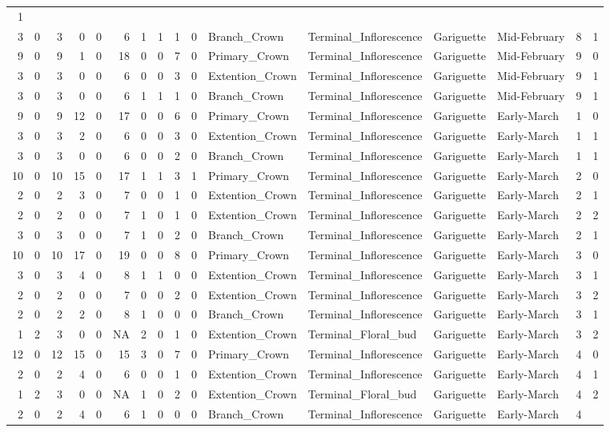 \documentclass[]{article}
\begin{document}
\begin{longtable}[]{@{}rrrrrrrrrrllllrl@{}}
1\tabularnewline
3 & 0 & 3 & 0 & 0 & 6 & 1 & 1 & 1 & 0 & Branch\_Crown &
Terminal\_Inflorescence & Gariguette & Mid-February & 8 &
1\tabularnewline
9 & 0 & 9 & 1 & 0 & 18 & 0 & 0 & 7 & 0 & Primary\_Crown &
Terminal\_Inflorescence & Gariguette & Mid-February & 9 &
0\tabularnewline
3 & 0 & 3 & 0 & 0 & 6 & 0 & 0 & 3 & 0 & Extention\_Crown &
Terminal\_Inflorescence & Gariguette & Mid-February & 9 &
1\tabularnewline
3 & 0 & 3 & 0 & 0 & 6 & 1 & 1 & 1 & 0 & Branch\_Crown &
Terminal\_Inflorescence & Gariguette & Mid-February & 9 &
1\tabularnewline
9 & 0 & 9 & 12 & 0 & 17 & 0 & 0 & 6 & 0 & Primary\_Crown &
Terminal\_Inflorescence & Gariguette & Early-March & 1 &
0\tabularnewline
3 & 0 & 3 & 2 & 0 & 6 & 0 & 0 & 3 & 0 & Extention\_Crown &
Terminal\_Inflorescence & Gariguette & Early-March & 1 &
1\tabularnewline
3 & 0 & 3 & 0 & 0 & 6 & 0 & 0 & 2 & 0 & Branch\_Crown &
Terminal\_Inflorescence & Gariguette & Early-March & 1 &
1\tabularnewline
10 & 0 & 10 & 15 & 0 & 17 & 1 & 1 & 3 & 1 & Primary\_Crown &
Terminal\_Inflorescence & Gariguette & Early-March & 2 &
0\tabularnewline
2 & 0 & 2 & 3 & 0 & 7 & 0 & 0 & 1 & 0 & Extention\_Crown &
Terminal\_Inflorescence & Gariguette & Early-March & 2 &
1\tabularnewline
2 & 0 & 2 & 0 & 0 & 7 & 1 & 0 & 1 & 0 & Extention\_Crown &
Terminal\_Inflorescence & Gariguette & Early-March & 2 &
2\tabularnewline
3 & 0 & 3 & 0 & 0 & 7 & 1 & 0 & 2 & 0 & Branch\_Crown &
Terminal\_Inflorescence & Gariguette & Early-March & 2 &
1\tabularnewline
10 & 0 & 10 & 17 & 0 & 19 & 0 & 0 & 8 & 0 & Primary\_Crown &
Terminal\_Inflorescence & Gariguette & Early-March & 3 &
0\tabularnewline
3 & 0 & 3 & 4 & 0 & 8 & 1 & 1 & 0 & 0 & Extention\_Crown &
Terminal\_Inflorescence & Gariguette & Early-March & 3 &
1\tabularnewline
2 & 0 & 2 & 0 & 0 & 7 & 0 & 0 & 2 & 0 & Extention\_Crown &
Terminal\_Inflorescence & Gariguette & Early-March & 3 &
2\tabularnewline
2 & 0 & 2 & 2 & 0 & 8 & 1 & 0 & 0 & 0 & Branch\_Crown &
Terminal\_Inflorescence & Gariguette & Early-March & 3 &
1\tabularnewline
1 & 2 & 3 & 0 & 0 & NA & 2 & 0 & 1 & 0 & Extention\_Crown &
Terminal\_Floral\_bud & Gariguette & Early-March & 3 & 2\tabularnewline
12 & 0 & 12 & 15 & 0 & 15 & 3 & 0 & 7 & 0 & Primary\_Crown &
Terminal\_Inflorescence & Gariguette & Early-March & 4 &
0\tabularnewline
2 & 0 & 2 & 4 & 0 & 6 & 0 & 0 & 1 & 0 & Extention\_Crown &
Terminal\_Inflorescence & Gariguette & Early-March & 4 &
1\tabularnewline
1 & 2 & 3 & 0 & 0 & NA & 1 & 0 & 2 & 0 & Extention\_Crown &
Terminal\_Floral\_bud & Gariguette & Early-March & 4 & 2\tabularnewline
2 & 0 & 2 & 4 & 0 & 6 & 1 & 0 & 0 & 0 & Branch\_Crown &
Terminal\_Inflorescence & Gariguette & Early-March & 4 &

\end{longtable}
\end{document}
